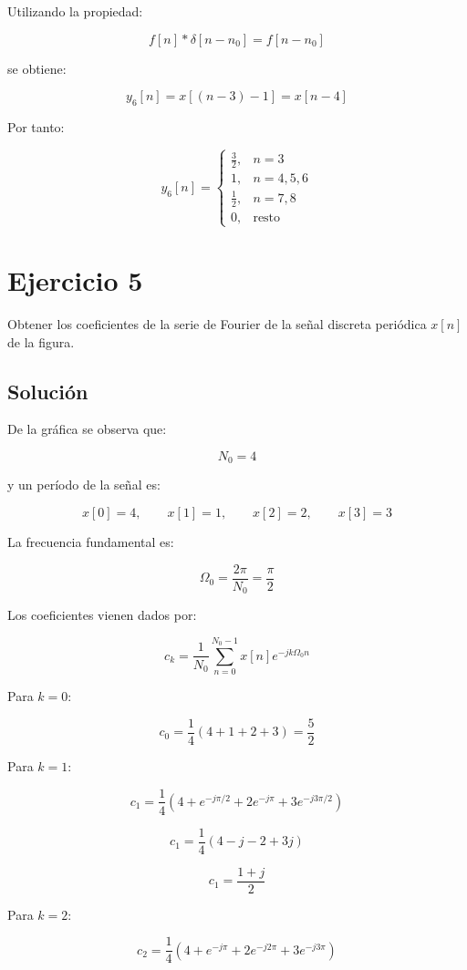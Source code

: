 \documentclass[fleqn]{article}
\begin{document}
	Utilizando la propiedad:

	\[
	f[n]*\delta[n-n_0]
	=
	f[n-n_0]
	\]

	se obtiene:

	\[
	y_6[n]
	=
	x[(n-3)-1]
	=
	x[n-4]
	\]

	Por tanto:

	\[
	\boxed{
	y_6[n]=
	\begin{cases}
	\frac{3}{2}, & n=3 \\[1mm]
	1, & n=4,5,6 \\[1mm]
	\frac{1}{2}, & n=7,8 \\[1mm]
	0, & \text{resto}
	\end{cases}
	}
	\]

\section{Ejercicio 5}
	Obtener los coeficientes de la serie de Fourier de la señal discreta periódica $x[n]$ de la figura.

	\subsection{Solución}

	De la gráfica se observa que:

	\[
	N_0=4
	\]

	y un período de la señal es:

	\[
	x[0]=4,
	\qquad
	x[1]=1,
	\qquad
	x[2]=2,
	\qquad
	x[3]=3
	\]

	La frecuencia fundamental es:

	\[
	\Omega_0
	=
	\frac{2\pi}{N_0}
	=
	\frac{\pi}{2}
	\]

	Los coeficientes vienen dados por:

	\[
	c_k
	=
	\frac{1}{N_0}
	\sum_{n=0}^{N_0-1}
	x[n]e^{-jk\Omega_0n}
	\]

	Para $k=0$:

	\[
	c_0
	=
	\frac{1}{4}
	(4+1+2+3)
	=
	\frac{5}{2}
	\]

	Para $k=1$:

	\[
	c_1
	=
	\frac{1}{4}
	\left(
	4
	+
	e^{-j\pi/2}
	+
	2e^{-j\pi}
	+
	3e^{-j3\pi/2}
	\right)
	\]

	\[
	c_1
	=
	\frac{1}{4}
	\left(
	4-j-2+3j
	\right)
	\]

	\[
	c_1
	=
	\frac{1+j}{2}
	\]

	Para $k=2$:

	\[
	c_2
	=
	\frac{1}{4}
	\left(
	4
	+
	e^{-j\pi}
	+
	2e^{-j2\pi}
	+
	3e^{-j3\pi}
	\right)
	\]
\end{document}
